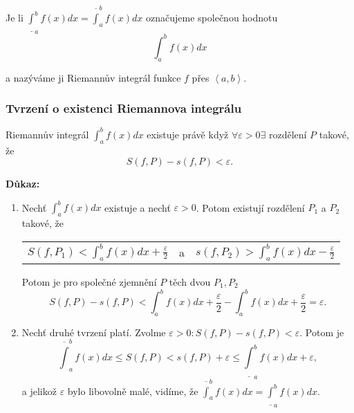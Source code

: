 \documentclass[../main.tex]{subfiles}
\begin{document}
Je li $\underline{\int}^b_a f(x) dx = \overline{\int}^b_a f(x) dx$ označujeme společnou hodnotu
\[\int^b_a f(x) dx\]

a nazýváme ji Riemannův integrál funkce $f$ přes $\left<a,b\right>$.
\noindent
\subsubsection{Tvrzení o existenci Riemannova integrálu}
\hspace{1.2mm}
Riemannův integrál $\int^b_a f(x) dx$ existuje právě když $\forall \varepsilon > 0 \exists$ rozdělení $P$ takové, že
\[S(f,P) - s(f,P) < \varepsilon.\]

\vspace{5mm}
\noindent
\textbf{Důkaz:} 
\begin{enumerate}
    \item Nechť $\int^b_a f(x) dx$ existuje a nechť $\varepsilon > 0$. Potom existují rozdělení $P_1$ a $P_2$ takové, že
    \begin{center}
        \begin{tabular}{ c c c }
            $S(f,P_1) < \int^b_a f(x) dx + \frac{\varepsilon}{2}$ & a & $s(f,P_2) > \int^b_a f(x) dx - \frac{\varepsilon}{2}$  \\
        \end{tabular}
    \end{center}
    Potom je pro společné zjemnění $P$ těch dvou $P_1,P_2$
    \[S(f,P) - s(f,P) < \int^b_a f(x)dx + \frac{\varepsilon}{2} - \int^b_a f(x)dx + \frac{\varepsilon}{2} = \varepsilon.\]
    \item Nechť druhé tvrzení platí. Zvolme $\varepsilon > 0 : S(f,P) - s(f,P) < \varepsilon.$ Potom je 
    \[\overline{\int}^b_a f(x)dx \leq S(f,P) < s(f,P) + \varepsilon \leq \underline{\int}^b_a f(x)dx + \varepsilon,\]
    a jelikož $\varepsilon$ bylo libovolně malé, vidíme, že $\overline{\int}^b_a f(x)dx = \underline{\int}^b_a f(x)dx.$
\end{enumerate}
\noindent


\end{document}
